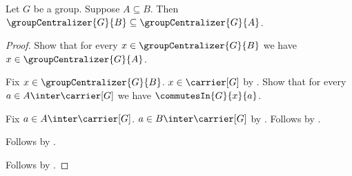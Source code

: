 \begin{theorem}\label{group_centralizer_antitone}
    Let $G$ be a group.
    Suppose $A\subseteq B$.
    Then
        $\groupCentralizer{G}{B}\subseteq
         \groupCentralizer{G}{A}$.
\end{theorem}
\begin{proof}
    Show that for every $x\in\groupCentralizer{G}{B}$ we have
        $x\in\groupCentralizer{G}{A}$.
    \begin{subproof}
        Fix $x\in\groupCentralizer{G}{B}$.
        $x\in\carrier[G]$ by .
        Show that for every $a\in A\inter\carrier[G]$ we have
            $\commutesIn{G}{x}{a}$.
        \begin{subproof}
            Fix $a\in A\inter\carrier[G]$.
            $a\in B\inter\carrier[G]$ by
                .
            Follows by .
        \end{subproof}
        Follows by .
    \end{subproof}
    Follows by .
\end{proof}

